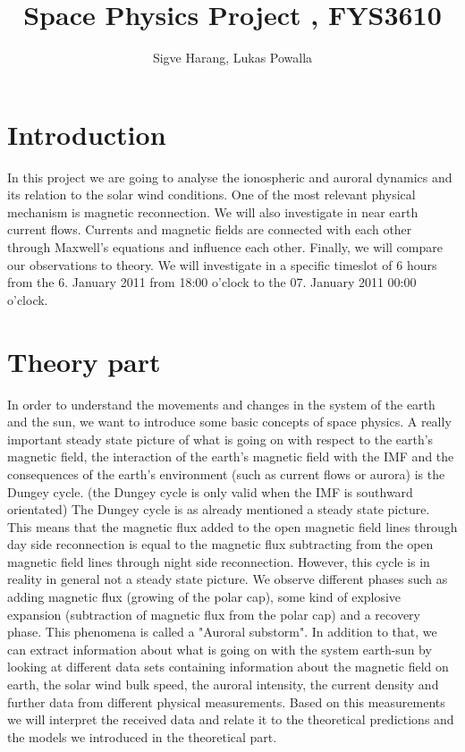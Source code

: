 \documentclass[10pt,a4paper]{article}
\author{Sigve Harang, Lukas Powalla}
\title{Space Physics Project , FYS3610}
\begin{document}
\maketitle
\newpage
\tableofcontents
\newpage
\section*{Introduction}
In this project we are going to analyse the ionospheric and auroral dynamics and its relation to the solar wind conditions. One of the most relevant physical mechanism is magnetic reconnection. We will also investigate in near earth current flows. Currents and magnetic fields are connected with each other through Maxwell's equations and influence each other. Finally, we will compare our observations to theory. We will investigate in a specific timeslot of 6 hours from the 6. January 2011 from 18:00 o'clock to the 07. January 2011 00:00 o'clock.   
\section{Theory part}
In order to understand the movements and changes in the system of the earth and the sun, we want to introduce some basic concepts of space physics. 
A really important steady state picture of what is going on with respect to the earth's magnetic field, the interaction of the earth's magnetic field with the IMF and the consequences of the earth's environment (such as current flows or aurora) is the Dungey cycle. (the Dungey cycle is only valid when the IMF is southward orientated)
The Dungey cycle is as already mentioned a steady state picture. This means that the magnetic flux added to the open magnetic field lines through day side reconnection is equal to the magnetic flux subtracting from the open magnetic field lines through night side reconnection.
However, this cycle is in reality in general not a steady state picture. We observe different phases such as adding magnetic flux (growing of the polar cap), some kind of explosive expansion (subtraction of magnetic flux from the polar cap) and a recovery phase. This phenomena is called a "Auroral substorm". In addition to that, we can extract information about what is going on with the system earth-sun by looking at different data sets containing information about the magnetic field on earth, the solar wind bulk speed, the auroral intensity, the current density and further data from different physical measurements. 
Based on this measurements we will interpret the received data and relate it to the theoretical predictions and the models we introduced in the theoretical part.
\end{document}
